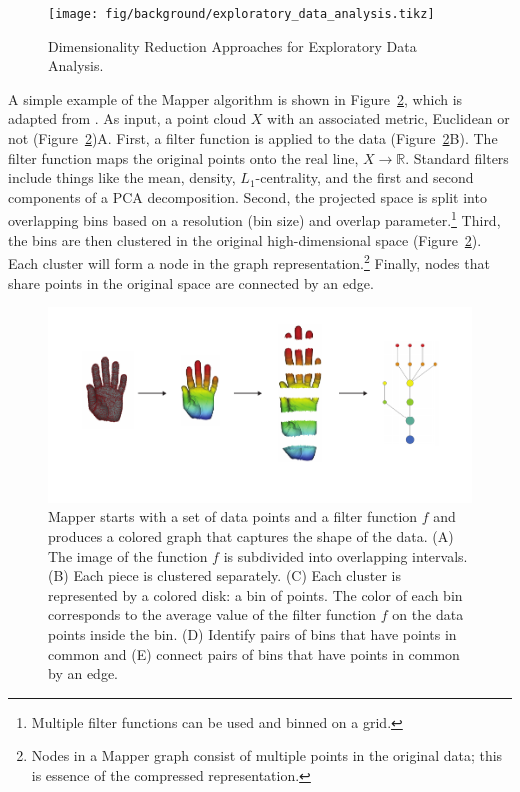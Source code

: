 \begin{figure}
\centering
\texttt{[image: fig/background/exploratory\_data\_analysis.tikz]}
\caption[Dimensionality Reduction for EDA]{Dimensionality Reduction Approaches for Exploratory Data Analysis.}
\label{fig:bg:exploratory_data_analysis}
\end{figure}

A simple example of the Mapper algorithm is shown in Figure~\ref{fig:bg:mapper}, which is adapted from \cite{Lum:2013cz}.
As input, a point cloud $X$ with an associated metric, Euclidean or not (Figure~\ref{fig:bg:mapper})A.
First, a filter function is applied to the data (Figure~\ref{fig:bg:mapper}B).
The filter function maps the original points onto the real line, $X\rightarrow\mathbb{R}$.
Standard filters include things like the mean, density, $L_1$-centrality, and the first and second components of a PCA decomposition.
Second, the projected space is split into overlapping bins based on a resolution (bin size) and overlap parameter.\footnote{Multiple filter functions can be used and binned on a grid.}
Third, the bins are then clustered in the original high-dimensional space (Figure~\ref{fig:bg:mapper}).
Each cluster will form a node in the graph representation.\footnote{Nodes in a Mapper graph consist of multiple points in the original data; this is essence of the compressed representation.}
Finally, nodes that share points in the original space are connected by an edge.

\begin{figure}
\centering
\includegraphics[]{fig/background/mapper.pdf}
\caption[The Mapper Algorithm]{Mapper starts with a set of data points and a filter function $f$ and produces a colored graph that captures the shape of the data. (A) The image of the function $f$ is subdivided into overlapping intervals. (B) Each piece is clustered separately. (C) Each cluster is represented by a colored disk: a bin of points. The color of each bin corresponds to the average value of the filter function $f$ on the data points inside the bin. (D) Identify pairs of bins that have points in common and (E) connect pairs of bins that have points in common by an edge.}
\label{fig:bg:mapper}
\end{figure}


